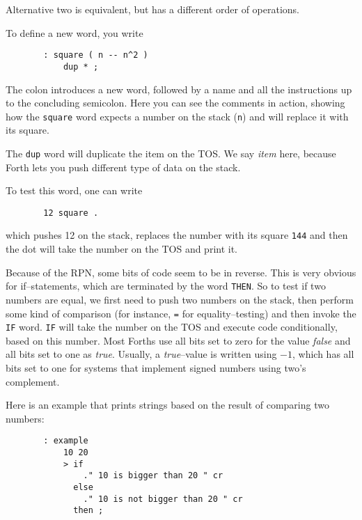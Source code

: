 Alternative two is equivalent, but has a different order of operations.

To define a new word, you write

\begin{figure}[H]
  \centering
  \begin{Verbatim}
  : square ( n -- n^2 )
      dup * ;
  \end{Verbatim}
\end{figure}

The colon introduces a new word, followed by a name and all the instructions
up to the concluding semicolon.  Here you can see the comments in action,
showing how the \texttt{square} word expects a number on the stack
(\texttt{n}) and will replace it with its square.

The \texttt{dup} word will duplicate the item on the \ac{TOS}.  We
say \textit{item} here, because Forth lets you push different type of data
on the stack.

To test this word, one can write 

\begin{figure}[H]
  \centering
  \begin{Verbatim}
  12 square .
  \end{Verbatim}
\end{figure}

which pushes 12 on the stack, replaces the number with its square
\texttt{144} and then the dot will take the number on the \ac{TOS}
and print it.

Because of the \ac{RPN}, some bits of code seem to be in reverse.  This is
very obvious for if--statements, which are terminated by the word
\texttt{THEN}.  So to test if two numbers are equal, we first need to push
two numbers on the stack, then perform some kind of comparison (for
instance, \texttt{=} for equality--testing) and then invoke the
\texttt{IF} word.  \texttt{IF} will take the number on the \ac{TOS}
and execute code conditionally, based on this number.  Most Forths use all
bits set to zero for the value \textit{false} and all bits set to one as
\textit{true}.  Usually, a \textit{true}--value is written using $-1$,
which has all bits set to one for systems that implement signed numbers
using two's complement.

Here is an example that prints strings based on the result of comparing two
numbers:

\begin{figure}[H]
  \centering
  \begin{Verbatim}
  : example
      10 20
      > if
          ." 10 is bigger than 20 " cr
        else
          ." 10 is not bigger than 20 " cr
        then ;
  \end{Verbatim}
\end{figure}

